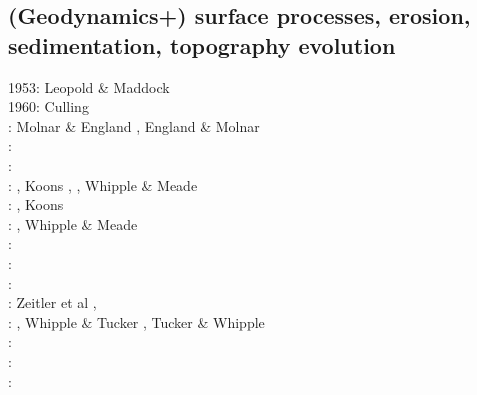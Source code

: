 \subsection{(Geodynamics+) surface processes, erosion, sedimentation, topography evolution}

\begin{scriptsize}
1953: Leopold \& Maddock \cite{lema53}\\
1960: Culling \cite{cull60}\\
\nineteenninety: Molnar \& England \cite{moen90}, England \& Molnar \cite{enmo90}\\
\nineteenninetytwo: \cite{befh92}\cite{chas92}\\
\nineteenninetythree: \cite{povp93}\cite{wibf93}\\
\nineteenninetyfour: \cite{howa94}, Koons \cite{koon94}, \cite{kobe94}\cite{gikb94}, 
                     Whipple \& Meade \cite{whme04}\\
\nineteenninetyfive: \cite{chmm95}, Koons \cite{koon95}\\
\nineteenninetysix: \cite{avbu96}\cite{bekh96}\cite{kobe96},
                     Whipple \& Meade \cite{whme06}\\
\nineteenninetyseven: \cite{brsa97}\cite{gaft97}\cite{babr97}\\
\nineteenninetyeight: \cite{deea98}\cite{vabr98}\\
\nineteenninetynine: \cite{will99a}\cite{bupi99}\cite{babr99}\cite{tobr99}\\
\twothousandone: Zeitler et al \cite{zemk01}, \cite{tulg01}\cite{brsh01}\cite{bupo01}\cite{coul01}\cite{crda01}\cite{moln01}\\
\twothousandtwo: \cite{wibr02}\cite{mobr02}\cite{garc02}, Whipple \& Tucker \cite{whtu02}, 
                 Tucker \& Whipple \cite{tuwh02}\\
\twothousandthree: \cite{brau03}\\
\twothousandfour: \cite{fijj04}\cite{gocl04}\cite{simp04}\cite{skdi04}\\
\twothousandfive: \cite{lave05}\cite{will05}\cite{lahd05}\\

\end{scriptsize}

